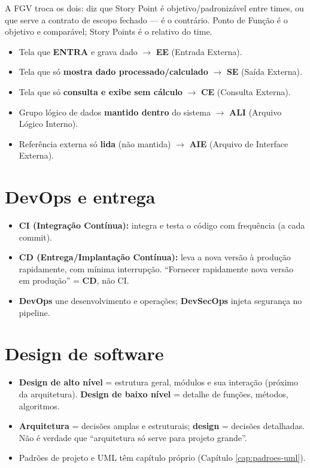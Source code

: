 \begin{pegadinha}
A FGV troca os dois: diz que Story Point é objetivo/padronizável entre times,
ou que serve a contrato de escopo fechado --- é o contrário. Ponto de Função é
o objetivo e comparável; Story Points é o relativo do time.
\end{pegadinha}

\begin{comosair}
\begin{itemize}
\item Tela que \textbf{ENTRA} e grava dado $\to$ \textbf{EE} (Entrada
Externa).
\item Tela que só \textbf{mostra dado processado/calculado} $\to$
\textbf{SE} (Saída Externa).
\item Tela que só \textbf{consulta e exibe sem cálculo} $\to$ \textbf{CE}
(Consulta Externa).
\item Grupo lógico de dados \textbf{mantido dentro} do sistema $\to$
\textbf{ALI} (Arquivo Lógico Interno).
\item Referência externa só \textbf{lida} (não mantida) $\to$ \textbf{AIE}
(Arquivo de Interface Externa).
\end{itemize}
\end{comosair}

\section{DevOps e entrega}

\begin{itemize}
\item \textbf{CI (Integração Contínua):} integra e testa o código com
frequência (a cada commit).
\item \textbf{CD (Entrega/Implantação Contínua):} leva a nova versão à
produção rapidamente, com mínima interrupção. ``Fornecer rapidamente nova
versão em produção'' = \textbf{CD}, não CI.
\item \textbf{DevOps} une desenvolvimento e operações; \textbf{DevSecOps}
injeta segurança no pipeline.
\end{itemize}

\section{Design de software}

\begin{itemize}
\item \textbf{Design de alto nível} = estrutura geral, módulos e sua
interação (próximo da arquitetura). \textbf{Design de baixo nível} = detalhe
de funções, métodos, algoritmos.
\item \textbf{Arquitetura} = decisões amplas e estruturais; \textbf{design} =
decisões detalhadas. Não é verdade que ``arquitetura só serve para projeto
grande''.
\item Padrões de projeto e UML têm capítulo próprio (Capítulo
\ref{cap:padroes-uml}).
\end{itemize}

